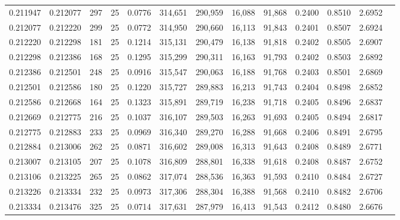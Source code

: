\begin{tabular}{rrrrrrrrrrrrr}
0.211947 & 0.212077 &   297 &  25 &                                     0.0776 & 314,651 & 290,959 &  16,088 &  91,868 & 0.2400 & 0.8510 & 2.6952 \\
0.212077 & 0.212220 &   299 &  25 &                                     0.0772 & 314,950 & 290,660 &  16,113 &  91,843 & 0.2401 & 0.8507 & 2.6924 \\
0.212220 & 0.212298 &   181 &  25 &                                     0.1214 & 315,131 & 290,479 &  16,138 &  91,818 & 0.2402 & 0.8505 & 2.6907 \\
0.212298 & 0.212386 &   168 &  25 &                                     0.1295 & 315,299 & 290,311 &  16,163 &  91,793 & 0.2402 & 0.8503 & 2.6892 \\
0.212386 & 0.212501 &   248 &  25 &                                     0.0916 & 315,547 & 290,063 &  16,188 &  91,768 & 0.2403 & 0.8501 & 2.6869 \\
0.212501 & 0.212586 &   180 &  25 &                                     0.1220 & 315,727 & 289,883 &  16,213 &  91,743 & 0.2404 & 0.8498 & 2.6852 \\
0.212586 & 0.212668 &   164 &  25 &                                     0.1323 & 315,891 & 289,719 &  16,238 &  91,718 & 0.2405 & 0.8496 & 2.6837 \\
0.212669 & 0.212775 &   216 &  25 &                                     0.1037 & 316,107 & 289,503 &  16,263 &  91,693 & 0.2405 & 0.8494 & 2.6817 \\
0.212775 & 0.212883 &   233 &  25 &                                     0.0969 & 316,340 & 289,270 &  16,288 &  91,668 & 0.2406 & 0.8491 & 2.6795 \\
0.212884 & 0.213006 &   262 &  25 &                                     0.0871 & 316,602 & 289,008 &  16,313 &  91,643 & 0.2408 & 0.8489 & 2.6771 \\
0.213007 & 0.213105 &   207 &  25 &                                     0.1078 & 316,809 & 288,801 &  16,338 &  91,618 & 0.2408 & 0.8487 & 2.6752 \\
0.213106 & 0.213225 &   265 &  25 &                                     0.0862 & 317,074 & 288,536 &  16,363 &  91,593 & 0.2410 & 0.8484 & 2.6727 \\
0.213226 & 0.213334 &   232 &  25 &                                     0.0973 & 317,306 & 288,304 &  16,388 &  91,568 & 0.2410 & 0.8482 & 2.6706 \\
0.213334 & 0.213476 &   325 &  25 &                                     0.0714 & 317,631 & 287,979 &  16,413 &  91,543 & 0.2412 & 0.8480 & 2.6676 \\

\end{tabular}
